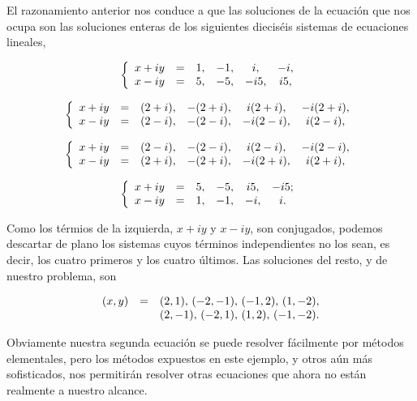 El razonamiento anterior nos conduce a que las soluciones de la ecuación
que nos ocupa son las soluciones enteras de los siguientes dieciséis
sistemas de ecuaciones lineales,

\[\left\{
\begin{array}{rccccccc}
x+iy&=&1,&-1,&i,&-i,\cr
x-iy&=&5,&-5,&-i5,&i5,
\end{array}
\right.\]

\[\left\{
\begin{array}{rccccccc}
x+iy&=&(2+i),&-(2+i),&i(2+i),&-i(2+i),\cr
x-iy&=&(2-i),&-(2-i),&-i(2-i),&i(2-i),
\end{array}
\right.\]

\[\left\{
\begin{array}{rccccccc}
x+iy&=&(2-i),&-(2-i),&i(2-i),&-i(2-i),\cr
x-iy&=&(2+i),&-(2+i),&-i(2+i),&i(2+i),
\end{array}
\right.\]

\[\left\{
\begin{array}{rccccccc}
x+iy&=&5,&-5,& i5,& -i5;\cr
x-iy&=&1,&-1,& -i,& i.
\end{array}
\right.\]

Como los térmios de la izquierda, \(x+iy\) y \(x-iy\), son conjugados,
podemos descartar de plano los sistemas cuyos términos independientes no
los sean, es decir, los cuatro primeros y los cuatro últimos. Las
soluciones del resto, y de nuestro problema, son

\[\begin{array}{rcl}
(x,y)&=&(2,1),\,(-2,-1),\,(-1,2),\,(1,-2),\cr 
&&(2,-1),\,(-2,1),\,(1,2),\,(-1,-2).
\end{array}\]

Obviamente nuestra segunda ecuación se puede resolver fácilmente por
métodos elementales, pero los métodos expuestos en este ejemplo, y otros
aún más sofisticados, nos permitirán resolver otras ecuaciones que ahora
no están realmente a nuestro alcance.
